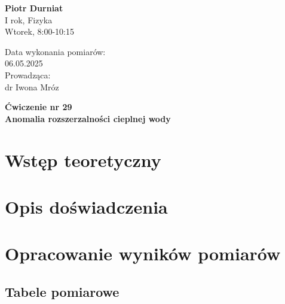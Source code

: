 \documentclass[a4paper,12pt]{article}
\begin{document}
\noindent
\begin{minipage}{0.5\textwidth}
    \raggedright
    \textbf{Piotr Durniat} \\
    I rok, Fizyka \\
    Wtorek, 8:00-10:15 \\
    \vspace{0.5cm}
    \vspace{0.5cm}
\end{minipage}%
\begin{minipage}{0.5\textwidth}
    \raggedleft
    Data wykonania pomiarów: \\
    06.05.2025 \\
    \vspace{0.5cm}
    Prowadząca: \\
    dr Iwona Mróz
\end{minipage}

\vspace{2cm}
\begin{center}
    \LARGE \textbf{Ćwiczenie nr 29} \\[0.5cm]
    \Large \textbf{Anomalia rozszerzalności cieplnej wody}
\end{center}

\vspace{1cm}
\noindent

\tableofcontents
\newpage

\section{Wstęp teoretyczny}

\section{Opis doświadczenia}

\section{Opracowanie wyników pomiarów}

\subsection{Tabele pomiarowe}
\end{document}
